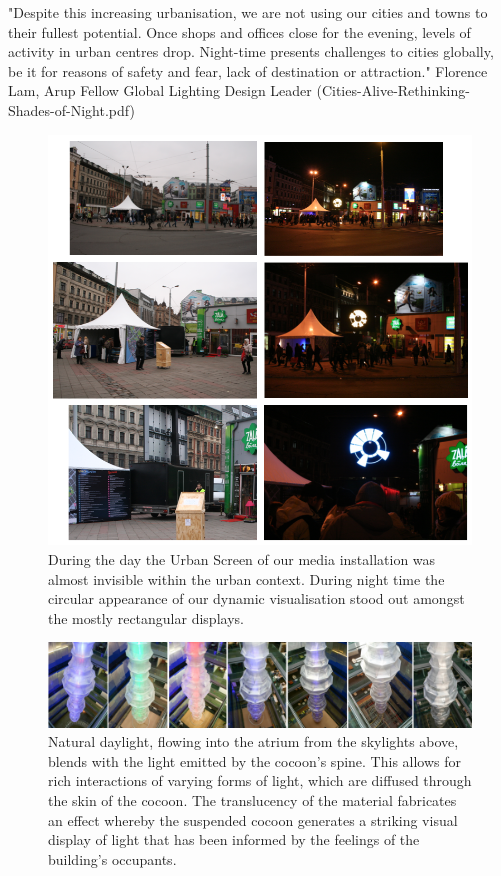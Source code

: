 "Despite this increasing urbanisation, we are not using our cities and towns to their fullest potential. Once shops and offices close for the evening, levels of activity in urban centres drop.
Night-time presents challenges to cities globally, be it for reasons of safety and fear, lack of destination or attraction."
Florence Lam, Arup Fellow Global Lighting Design Leader (Cities-Alive-Rethinking-Shades-of-Night.pdf)
\begin{figure}[!h] 
\centering
\includegraphics[width=\textwidth]{Illustrations/RIGA_day_night.png}
\caption [Day versus Night aspects of Media Architecture (RIGA)] {During the day the Urban Screen of our media installation was almost invisible within the urban context. During night time the circular appearance of our dynamic visualisation stood out amongst the mostly rectangular displays.}
\label{RIGAdaynight}
\end{figure}


\begin{figure}[!h] 
\centering
\includegraphics[width=\textwidth]{Illustrations/ARUP_daynight.png}
\caption [Day versus Night aspects of Media Architecture (ARUP)] {Natural daylight, flowing into the atrium from the skylights above, blends with the light emitted by the cocoon’s spine. 
This allows for rich interactions of varying forms of light, which are diffused through the skin of the cocoon. 
The translucency of the material fabricates an effect whereby the suspended cocoon generates a striking visual display of light that has been informed by the feelings of the building’s occupants.}
\label{ARUPdaynight}
\end{figure}

